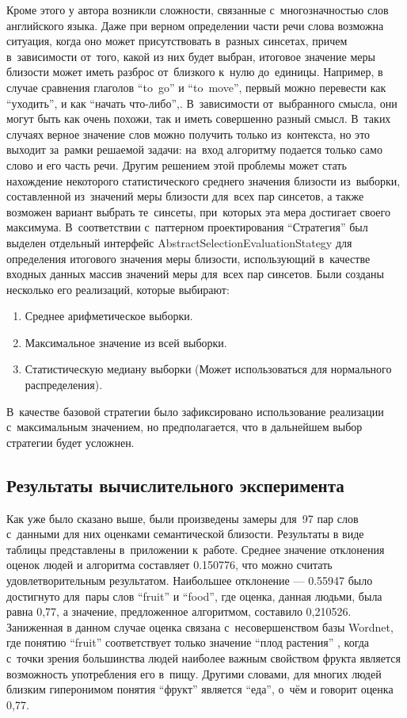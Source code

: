 Кроме этого у  автора возникли сложности, связанные с~многозначностью слов английского языка.
Даже при верном определении части речи слова возможна ситуация, 
когда оно может присутствовать в~разных синсетах, 
причем в~зависимости от~того, какой из них будет выбран,
итоговое значение меры близости может иметь разброс от~близкого к~нулю до~единицы.
Например, в случае сравнения глаголов ``to~go'' и ``to~move'',  
первый можно перевести как ``уходить'',
и как ``начать что-либо'',.
В~зависимости от~выбранного смысла, они могут быть как очень похожи,
так и иметь совершенно разный смысл.
В~таких случаях верное значение слов можно получить только из~контекста, 
но это выходит за~рамки решаемой задачи: 
на~вход алгоритму подается только само слово и его часть речи.
Другим решением этой проблемы может стать нахождение некоторого статистического среднего значения близости из~выборки, 
составленной из~значений меры близости для~всех пар синсетов,
а также возможен вариант выбрать те~синсеты, при~которых эта мера достигает своего максимума.
В~соответствии с~паттерном проектирования ``Стратегия'' \cite{strategy} 
был выделен отдельный интерфейс AbstractSelectionEvaluationStategy для определения итогового значения меры близости, 
использующий в~качестве входных данных массив значений меры для~всех пар синсетов.
Были созданы несколько его реализаций, которые выбирают:

\begin{enumerate}

\item{Среднее арифметическое выборки.}
\item{Максимальное значение из всей выборки.}
\item{Статистическую медиану выборки (Может использоваться для нормального распределения).}

\end{enumerate}

В~качестве базовой стратегии было зафиксировано использование реализации с~максимальным значением,
но предполагается, что в дальнейшем выбор стратегии будет усложнен.

\subsection{Результаты вычислительного эксперимента}

Как уже было сказано выше, были произведены замеры для~97 пар слов с~данными для них оценками семантической близости. 
Результаты в виде таблицы представлены в~приложении к~работе.
Среднее значение отклонения оценок людей и алгоритма составляет 0.150776,
что можно считать удовлетворительным результатом.
Наибольшее отклонение --- 0.55947 было достигнуто для~пары слов
``fruit'' и ``food'',
где оценка, данная людьми, была равна 0,77, 
а значение, предложенное алгоритмом, составило 0,210526. 
Заниженная в данном случае оценка связана с~несовершенством базы Wordnet, 
где понятию ``fruit'' соответствует только значение ``плод растения'' ,
когда с~точки зрения большинства людей наиболее важным свойством фрукта является возможность употребления его в~пищу. 
Другими словами, для многих людей близким гиперонимом понятия ``фрукт'' является ``еда'', 
о~чём и говорит оценка 0,77.
